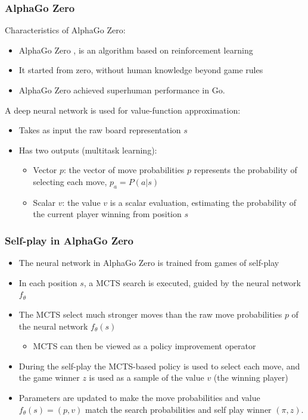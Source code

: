 \documentclass[9pt]{beamer}
\begin{document}

\begin{frame}
	\frametitle{AlphaGo Zero}
	Characteristics of AlphaGo Zero:
	\begin{itemize}
		\item AlphaGo Zero \cite{silver2017mastering}, is an algorithm based on reinforcement learning
		\item It started from zero, without human knowledge beyond game rules
		\item AlphaGo Zero achieved superhuman performance in Go.
	\end{itemize}

	A deep neural network is used for value-function approximation:
	\begin{itemize}
		\item Takes as input the raw board representation $s$
		\item Has two outputs (multitask learning):
		\begin{itemize}		
			\item Vector $p$: the vector of move probabilities $p$ represents the probability of selecting each move, $p_a = P(a | s)$
			\item Scalar $v$: the value $v$ is a scalar evaluation, estimating the probability of the current player winning from position $s$
		\end{itemize}
	\end{itemize}
\end{frame}



\begin{frame}
	\frametitle{Self-play in AlphaGo Zero}
	
	\begin{itemize}
		\item The neural network in AlphaGo Zero is trained from games of self-play
		\item In each position $s$, a MCTS search is executed, guided by the neural network $f_\theta$
		
		\item The MCTS select much stronger moves than the raw move probabilities $p$ of the neural network $f_\theta(s)$

		\begin{itemize}
			\item MCTS can then be viewed as a policy improvement operator
		\end{itemize}
		
		\item During the self-play the MCTS-based policy is used to select each move, and the game winner $z$ is used as a sample of the value $v$ (the winning player)
		\item Parameters are updated to make the move probabilities and value $f_\theta(s) = (p, v) $ match the search probabilities and self play winner $(\pi, z)$.
	\end{itemize}
\end{frame}
\end{document}
